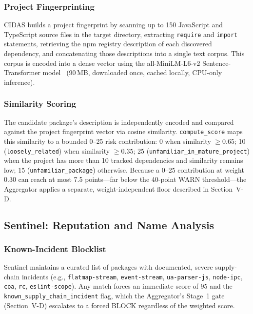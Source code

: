\documentclass[journal]{IEEEtran}
\begin{document}
\subsubsection{Project Fingerprinting}
CIDAS builds a project fingerprint by scanning up to 150 JavaScript and TypeScript source files in the
target directory, extracting \texttt{require} and \texttt{import} statements, retrieving the npm registry
description of each discovered dependency, and concatenating those descriptions into a single text corpus.
This corpus is encoded into a dense vector using the all-MiniLM-L6-v2 Sentence-Transformer
model~\cite{reimers2019} (90\,MB, downloaded once, cached locally, CPU-only inference).

\subsubsection{Similarity Scoring}
The candidate package's description is independently encoded and compared against the project fingerprint
vector via cosine similarity. \texttt{compute\_score} maps this similarity to a bounded 0--25 risk
contribution: 0 when similarity $\geq 0.65$; 10 (\texttt{loosely\_related}) when similarity $\geq 0.35$; 25
(\texttt{unfamiliar\_in\_mature\_project}) when the project has more than 10 tracked dependencies and
similarity remains low; 15 (\texttt{unfamiliar\_package}) otherwise. Because a 0--25 contribution at weight
0.30 can reach at most 7.5 points---far below the 40-point WARN threshold---the Aggregator applies a
separate, weight-independent floor described in Section~V-D.

\subsection{Sentinel: Reputation and Name Analysis}

\subsubsection{Known-Incident Blocklist}
Sentinel maintains a curated list of packages with documented, severe supply-chain incidents (e.g.,
\texttt{flatmap-stream}, \texttt{event-stream}, \texttt{ua-parser-js}, \texttt{node-ipc}, \texttt{coa},
\texttt{rc}, \texttt{eslint-scope}). Any match forces an immediate score of 95 and the
\texttt{known\_supply\_chain\_incident} flag, which the Aggregator's Stage~1 gate (Section~V-D) escalates to
a forced BLOCK regardless of the weighted score.
\end{document}
